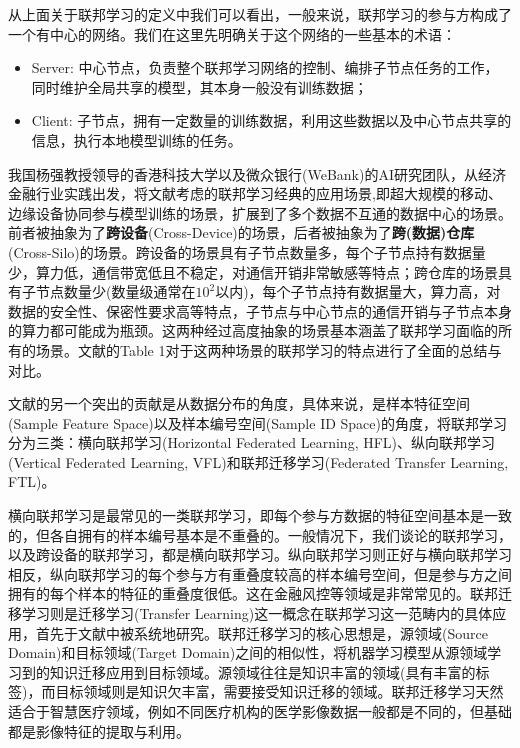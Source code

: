 从上面关于联邦学习的定义中我们可以看出，一般来说，联邦学习的参与方构成了一个有中心的网络。我们在这里先明确关于这个网络的一些基本的术语：
\begin{itemize}
    \item Server: 中心节点，负责整个联邦学习网络的控制、编排子节点任务的工作，同时维护全局共享的模型，其本身一般没有训练数据；
    \item Client: 子节点，拥有一定数量的训练数据，利用这些数据以及中心节点共享的信息，执行本地模型训练的任务。
\end{itemize}

我国杨强教授领导的香港科技大学以及微众银行(WeBank)的AI研究团队，从经济金融行业实践出发，将文献\parencite{mcmahan2017fed_avg}考虑的联邦学习经典的应用场景,即超大规模的移动、边缘设备协同参与模型训练的场景，扩展到了多个数据不互通的数据中心的场景\cite{Yang_2019_VFL}。前者被抽象为了\textbf{跨设备}(Cross-Device)的场景，后者被抽象为了\textbf{跨(数据)仓库}(Cross-Silo)的场景\cite{kairouz2019advances_fl}。跨设备的场景具有子节点数量多，每个子节点持有数据量少，算力低，通信带宽低且不稳定，对通信开销非常敏感等特点；跨仓库的场景具有子节点数量少(数量级通常在$10^2$以内)，每个子节点持有数据量大，算力高，对数据的安全性、保密性要求高等特点，子节点与中心节点的通信开销与子节点本身的算力都可能成为瓶颈。这两种经过高度抽象的场景基本涵盖了联邦学习面临的所有的场景。文献\parencite{kairouz2019advances_fl}的Table 1对于这两种场景的联邦学习的特点进行了全面的总结与对比。

文献\parencite{Yang_2019_VFL}的另一个突出的贡献是从数据分布的角度，具体来说，是样本特征空间(Sample Feature Space)以及样本编号空间(Sample ID Space)的角度，将联邦学习分为三类：横向联邦学习(Horizontal Federated Learning, HFL)、纵向联邦学习(Vertical Federated Learning, VFL)和联邦迁移学习(Federated Transfer Learning, FTL)。

横向联邦学习是最常见的一类联邦学习，即每个参与方数据的特征空间基本是一致的，但各自拥有的样本编号基本是不重叠的。一般情况下，我们谈论的联邦学习，以及跨设备的联邦学习，都是横向联邦学习。纵向联邦学习则正好与横向联邦学习相反，纵向联邦学习的每个参与方有重叠度较高的样本编号空间，但是参与方之间拥有的每个样本的特征的重叠度很低。这在金融风控等领域是非常常见的。联邦迁移学习则是迁移学习(Transfer Learning)这一概念在联邦学习这一范畴内的具体应用，首先于文献\parencite{liu_2020_transfer_fl}中被系统地研究。联邦迁移学习的核心思想是，源领域(Source Domain)和目标领域(Target Domain)之间的相似性，将机器学习模型从源领域学习到的知识迁移应用到目标领域。源领域往往是知识丰富的领域(具有丰富的标签)，而目标领域则是知识欠丰富，需要接受知识迁移的领域。联邦迁移学习天然适合于智慧医疗领域，例如不同医疗机构的医学影像数据一般都是不同的，但基础都是影像特征的提取与利用。

